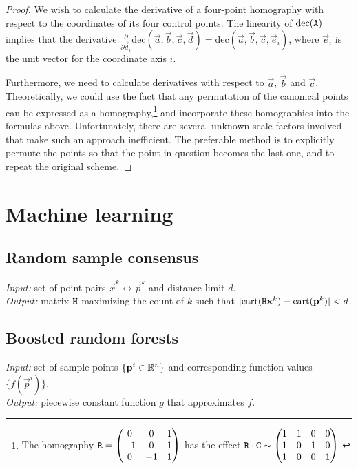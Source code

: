 \begin{proof}
We wish to calculate the derivative of a four-point homography with respect to the coordinates of its four control points.
The linearity of $\mathrm{dec}(\mathtt{A})$ implies that the derivative $\frac{\partial} {\partial \vec d_i} \mathrm{dec} \left( \vec a, \vec b, \vec c, \vec d \right) = \mathrm{dec} \left( \vec a, \vec b, \vec c, \vec e_i \right)$, where $\vec e_i$ is the unit vector for the coordinate axis $i$.

Furthermore, we need to calculate derivatives with respect to $\vec a$, $\vec b$ and $\vec c$.
Theoretically, we could use the fact that any permutation of the canonical points can be expressed as a homography,\footnote{
The homography $\mathtt{R} = \begin{pmatrix}
 0 & 0 & 1 \\
 -1 & 0 & 1 \\
 0 & -1 & 1
 \end{pmatrix}$ has the effect $\mathtt{R} \cdot \mathtt{C} \sim \begin{pmatrix}
 1 & 1 & 0 & 0 \\
 1 & 0 & 1 & 0 \\
 1 & 0 & 0 & 1
 \end{pmatrix}$.
} and incorporate these homographies into the formulas above.
Unfortunately, there are several unknown scale factors involved that make such an approach inefficient.
The preferable method is to explicitly permute the points so that the point in question becomes the last one, and to repeat the original scheme.
\end{proof}


\section{Machine learning}

\subsection{Random sample consensus}

\textit{Input:} set of point pairs $\vec x^k \leftrightarrow \vec p^k$ and distance limit $d$.\\
\textit{Output:} matrix $\mathtt{H}$ maximizing the count of $k$ such that $|\mathrm{cart}(\mathtt{H} \mathbf{x}^k) - \mathrm{cart}(\mathbf{p}^k)| < d$.\\

\subsection{Boosted random forests}

\textit{Input:} set of sample points $\{\mathbf{p}^i \in \mathbb{R}^n \}$ and corresponding function values $\{ f(\vec p^i) \}$.\\
\textit{Output:} piecewise constant function $g$ that approximates $f$.\\
